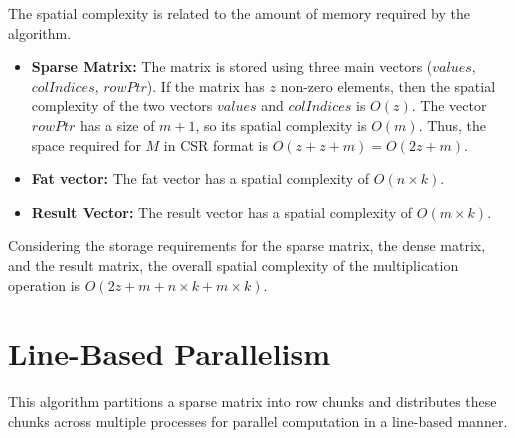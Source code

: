 \documentclass[12pt,oneside]{book} %
\begin{document}
The spatial complexity is related to the amount of memory required by the
algorithm.

\begin{itemize}
    \item \textbf{Sparse Matrix:} The matrix is stored using three main vectors (\( values \), \(colIndices \), \( rowPtr \)). If the matrix has \( z \) non-zero elements, then the spatial complexity of the two vectors \( values \) and \( colIndices \) is \( O(z) \). The vector \( rowPtr \) has a size of \( m + 1 \), so its spatial complexity is \( O(m) \). Thus, the space required for \( M \) in CSR format is \( O(z + z + m) = O(2z + m) \).
    \item \textbf{Fat vector:} The fat vector has a spatial complexity of \( O(n \times k) \).
    \item \textbf{Result Vector:} The result vector has a spatial complexity of \( O(m \times k) \).
\end{itemize}

Considering the storage requirements for the sparse matrix, the dense matrix,
and the result matrix, the overall spatial complexity of the multiplication
operation is \( O(2z + m + n \times k + m \times k) \).

\newpage
\section{Line-Based Parallelism}
This algorithm partitions a sparse matrix into row chunks and distributes these
chunks across multiple processes for parallel computation in a line-based
manner.
\end{document}
